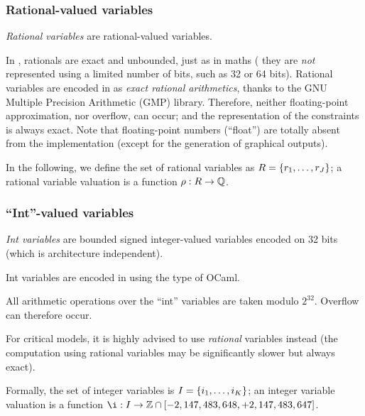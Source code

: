 \subsubsection{Rational-valued variables}

\emph{Rational variables} are rational-valued variables.

In \imitator{}, rationals are exact and unbounded, just as in maths (\ie{} they are \emph{not} represented using a limited number of bits, such as 32 or 64 bits).
%
Rational variables are encoded in \imitator{} as \emph{exact rational arithmetics}, thanks to the GNU Multiple Precision Arithmetic (GMP) library.
Therefore, neither floating-point approximation, nor overflow, can occur;
%
and the representation of the constraints is always exact.
Note that floating-point numbers (``float'') are totally absent from the \imitator{} implementation (except for the generation of graphical outputs).

In the following, we define the set of rational variables as $R = \{ r_1, \dots, r_J \} $;
a rational variable valuation is a function $\rho : R \rightarrow \mathbb Q$.



\subsubsection{``Int''-valued variables}

\emph{Int variables} are bounded signed integer-valued variables encoded on 32 bits (which is architecture independent).

Int variables are encoded in \imitator{} using the  type of OCaml.

\begin{becareful}
	All arithmetic operations over the ``int'' variables are taken modulo $2^{32}$.
	Overflow can therefore occur.
	
	For critical models, it is highly advised to use \emph{rational} variables instead (the computation using rational variables may be significantly slower but always exact).
\end{becareful}

Formally, the set of integer variables is $I = \{ i_1, \dots, i_K \} $;
an integer variable valuation is a function $\ival : \IVar \rightarrow \setZ \cap \left[-2,147,483,648, +2,147,483,647\right]$.


